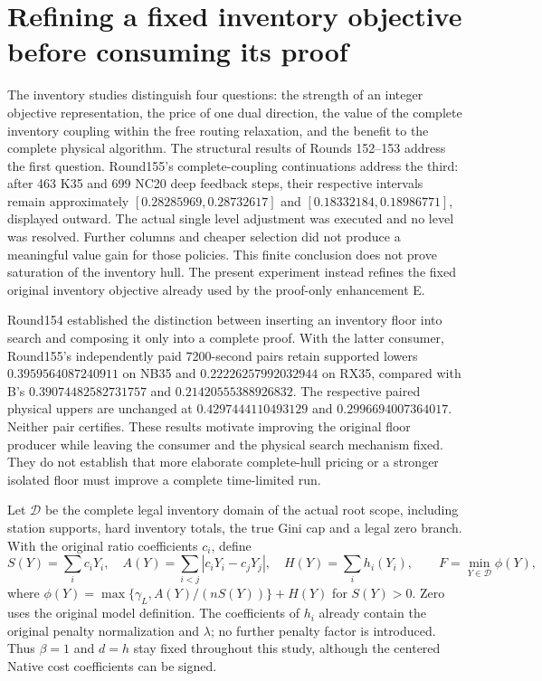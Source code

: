 \section{Refining a fixed inventory objective before consuming its proof}

The inventory studies distinguish four questions: the strength of an
integer objective representation, the price of one dual direction, the
value of the complete inventory coupling within the free routing relaxation,
and the benefit to the complete physical algorithm. The structural results
of Rounds 152--153 address the first question. Round155's complete-coupling
continuations address the third: after 463 K35 and 699 NC20 deep feedback
steps, their respective intervals remain approximately
$[0.28285969,0.28732617]$ and $[0.18332184,0.18986771]$, displayed outward.
The actual single level adjustment was executed and no level was resolved.
Further columns and cheaper selection did not produce a meaningful value
gain for those policies. This finite conclusion does not prove saturation
of the inventory hull. The present experiment instead refines the fixed
original inventory objective already used by the proof-only enhancement E.

Round154 established the distinction between inserting an inventory floor
into search and composing it only into a complete proof. With the latter
consumer, Round155's independently paid 7200-second pairs retain supported
lowers $0.3959564087240911$ on NB35 and $0.22226257992032944$ on RX35,
compared with B's $0.39074482582731757$ and $0.21420555388926832$.
The respective paired physical uppers are unchanged at
$0.4297444110493129$ and $0.2996694007364017$. Neither pair certifies.
These results motivate improving the original floor producer while leaving
the consumer and the physical search mechanism fixed. They do not establish
that more elaborate complete-hull pricing or a stronger isolated floor
must improve a complete time-limited run.

Let $\mathcal D$ be the complete legal inventory domain of the actual
root scope, including station supports, hard inventory totals, the true
Gini cap and a legal zero branch. With the original ratio coefficients
$c_i$, define
\[
 S(Y)=\sum_i c_iY_i,\quad
 A(Y)=\sum_{i<j}|c_iY_i-c_jY_j|,\quad
 H(Y)=\sum_i h_i(Y_i),\qquad
 F=\min_{Y\in\mathcal D}\phi(Y),
\]
where $\phi(Y)=\max\{\gamma_L,A(Y)/(nS(Y))\}+H(Y)$ for $S(Y)>0$.
Zero uses the original model definition. The coefficients of $h_i$ already
contain the original penalty normalization and $\lambda$; no further
penalty factor is introduced. Thus $\beta=1$ and $d=h$ stay fixed throughout
this study, although the centered Native cost coefficients can be signed.

